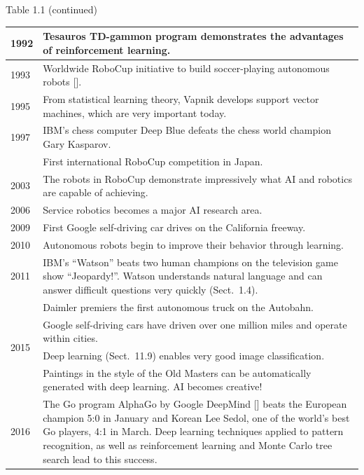 \documentclass[10pt]{book}
\begin{document}
Table 1.1 (continued)
\begin{center}
\begin{tabular}{|l|l|}
\hline
1992 & Tesauros TD-gammon program demonstrates the advantages of reinforcement learning. \\
\hline
1993 & Worldwide RoboCup initiative to build soccer-playing autonomous robots [\cite{roba}]. \\
\hline
1995 & From statistical learning theory, Vapnik develops support vector machines, which are very important today. \\
\hline
1997 & IBM's chess computer Deep Blue defeats the chess world champion Gary Kasparov. \\
\hline
 & First international RoboCup competition in Japan. \\
\hline
2003 & The robots in RoboCup demonstrate impressively what AI and robotics are capable of achieving. \\
\hline
2006 & Service robotics becomes a major AI research area. \\
\hline
2009 & First Google self-driving car drives on the California freeway. \\
\hline
2010 & Autonomous robots begin to improve their behavior through learning. \\
\hline
2011 & IBM's ``Watson'' beats two human champions on the television game show ``Jeopardy!''. Watson understands natural language and can answer difficult questions very quickly (Sect.~1.4). \\
\hline
\multirow[t]{4}{*}{2015} & Daimler premiers the first autonomous truck on the Autobahn. \\
\hline
 & Google self-driving cars have driven over one million miles and operate within cities. \\
\hline
 & Deep learning (Sect.~11.9) enables very good image classification. \\
\hline
 & Paintings in the style of the Old Masters can be automatically generated with deep learning. AI becomes creative! \\
\hline
2016 & The Go program AlphaGo by Google DeepMind [\cite{shm16}] beats the European champion 5:0 in January and Korean Lee Sedol, one of the world's best Go players, 4:1 in March. Deep learning techniques applied to pattern recognition, as well as reinforcement learning and Monte Carlo tree search lead to this success. \\
\hline
\end{tabular}
\end{center}
\end{document}
